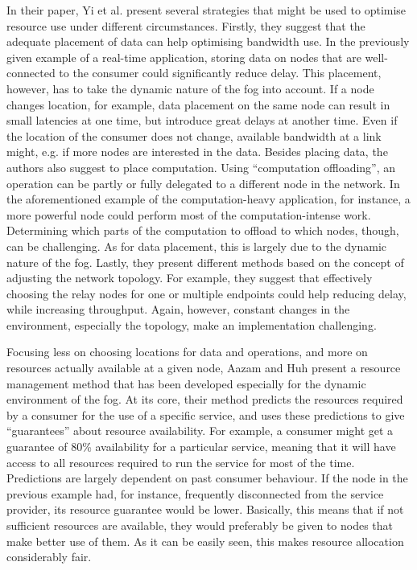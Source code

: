 \documentclass{article}
\begin{document}
In their paper, Yi et al. \cite{yi2015survey} present several strategies that might be used to optimise resource use under different circumstances. 
%
Firstly, they suggest that the adequate placement of data can help optimising bandwidth use. In the previously given example of a real-time application, storing data on nodes that are well-connected to the consumer could significantly reduce delay. This placement, however, has to take the dynamic nature of the fog into account. If a node changes location, for example, data placement on the same node can result in small latencies at one time, but introduce great delays at another time. Even if the location of the consumer does not change, available bandwidth at a link might, e.g. if more nodes are interested in the data.
%
Besides placing data, the authors also suggest to place computation. Using ``computation offloading'', an operation can be partly or fully delegated to a different node in the network. In the aforementioned example of the computation-heavy application, for instance, a more powerful node could perform most of the computation-intense work. Determining which parts of the computation to offload to which nodes, though, can be challenging. As for data placement, this is largely due to the dynamic nature of the fog.
%
Lastly, they present different methods based on the concept of adjusting the network topology. For example, they suggest that effectively choosing the relay nodes for one or multiple endpoints could help reducing delay, while increasing throughput. Again, however, constant changes in the environment, especially the topology, make an implementation challenging.

Focusing less on choosing locations for data and operations, and more on resources actually available at a given node, Aazam and Huh \cite{aazam2015dynamic} present a resource management method that has been developed especially for the dynamic environment of the fog. At its core, their method predicts the resources required by a consumer for the use of a specific service, and uses these predictions to give ``guarantees'' about resource availability. For example, a consumer might get a guarantee of 80\% availability for a particular service, meaning that it will have access to all resources required to run the service for most of the time. Predictions are largely dependent on past consumer behaviour. If the node in the previous example had, for instance, frequently disconnected from the service provider, its resource guarantee would be lower. Basically, this means that if not sufficient resources are available, they would preferably be given to nodes that make better use of them. As it can be easily seen, this makes resource allocation considerably fair.
\end{document}
